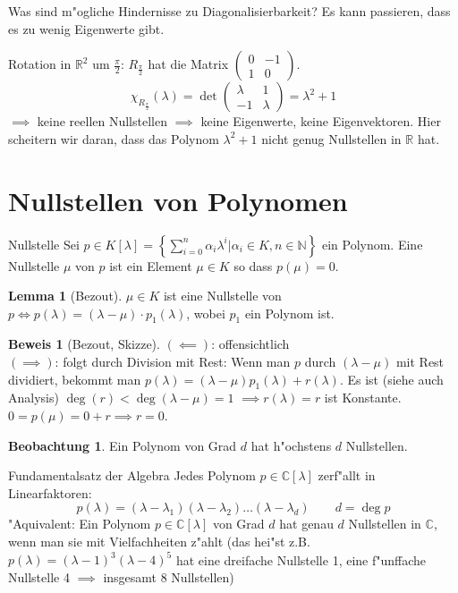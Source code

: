 \documentclass[fontsize=11pt,paper=a4,BCOR=0mm,DIV=11,automark,headsepline]{scrbook}
\newcommand{\gq}[1]{\glqq{}#1\grqq{}} %
\DeclareMathOperator{\mDeg}{deg}
\theoremstyle{remark}
\theoremstyle{definition}
\newtheorem{beobachtung}{Beobachtung}
\newtheorem{lemma}{Lemma}[section]
\theoremstyle{proof}
\newtheorem*{prof}{Beweis}
\theoremstyle{remark}
\begin{document}
Was sind m"ogliche Hindernisse zu Diagonalisierbarkeit?
Es kann passieren, dass es \gq{zu wenig} Eigenwerte gibt.
\begin{exa}[Rotation]
  Rotation in \(\mathbb{R}^2\) um \(\frac{\pi}{2}\): \(R_{\frac{\pi}{2}}\) hat die Matrix \(
  \begin{pmatrix}
    0 & -1 \\
    1 & 0
  \end{pmatrix}
  \).
  \[\chi_{R_{\frac{\pi}{2}}}(\lambda) = \det
    \begin{pmatrix}
      \lambda & 1\\
      -1 & \lambda
    \end{pmatrix}
    = \lambda^2 + 1
\] \(\implies\) keine reellen Nullstellen \(\implies\) keine Eigenwerte, keine Eigenvektoren. Hier scheitern wir daran, dass das Polynom \(\lambda^2+1\) nicht genug Nullstellen in \(\mathbb{R}\) hat.
\end{exa}

\section{Nullstellen von Polynomen}
\begin{definition}{Nullstelle}{}
  Sei \(p\in K[\lambda] = \left\{\sum_{i=0}^n\alpha_i\lambda^i|\alpha_i\in K, n\in\mathbb{N} \right\}\) ein Polynom. Eine Nullstelle \(\mu\) von \(p\) ist ein Element \(\mu\in K\) so dass \(p(\mu) = 0\).
\end{definition}
\begin{lemma}[Bezout]
  \(\mu\in K\) ist eine Nullstelle von \(p \iff p(\lambda) = (\lambda-\mu)\cdot p_1(\lambda)\), wobei \(p_1\) ein Polynom ist.
\end{lemma}
\begin{prof}[Bezout, Skizze]
  \((\impliedby)\): offensichtlich \\
  \((\implies)\): folgt durch Division mit Rest: Wenn man \(p\) durch \((\lambda-\mu)\) mit Rest dividiert, bekommt man \(p(\lambda) = (\lambda-\mu)p_1(\lambda) + r(\lambda)\). Es ist (siehe auch Analysis) \(\mDeg(r) < \mDeg(\lambda-\mu) = 1\) \(\implies r(\lambda)=r\) ist Konstante. \(0 = p(\mu) = 0 + r \implies r = 0\).
\end{prof}
\begin{beobachtung}
  Ein Polynom von Grad \(d\) hat h"ochstens \(d\) Nullstellen.
\end{beobachtung}
\begin{theo}{Fundamentalsatz der Algebra}
  Jedes Polynom \(p\in\mathbb{C}[\lambda]\) zerf"allt in Linearfaktoren:
  \[p(\lambda) = (\lambda - \lambda_1)(\lambda-\lambda_2)\dots(\lambda-\lambda_d) \qquad d = \mDeg p\]
  "Aquivalent: Ein Polynom \(p\in\mathbb{C}[\lambda]\) von Grad \(d\) hat genau \(d\) Nullstellen in \(\mathbb{C}\), wenn man sie mit Vielfachheiten z"ahlt (das hei"st z.B. \(p(\lambda) = (\lambda-1)^3(\lambda-4)^5\) hat eine dreifache Nullstelle 1, eine f"unffache Nullstelle 4 \(\implies\) insgesamt 8 Nullstellen)
\end{theo}
\end{document}
